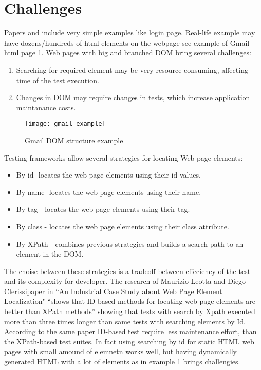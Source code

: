 	\section {Challenges}
	\label {sec:challenges}
		Papers \cite{Xu1} \cite{Zhongen2} and \cite{testGen3} include very simple
		examples like login page. Real-life example may have dozens/hundreds of html
		elements on the webpage see example of Gmail html page \ref{fig:gmailexample}.
		Web pages with big and branched DOM bring several challenges:
		\begin{enumerate}
		  \item Searching for required element may be very resource-consuming,
		  affecting time of the test execution. 
		  \item Changes in DOM may require changes in tests, which increase
		  application maintanance costs.
		\end{enumerate}
		
		\begin{figure}
		\label{fig:gmailexample}
		\texttt{[image: gmail\_example]}
		\caption{Gmail DOM structure example}
		\end{figure}
		
		Testing frameworks allow several strategies for locating Web page elements:
		\begin{itemize}
		  \item By id -locates the web page elements using their id values.
		  \item By name -locates the web page elements using their name.
		  \item By tag - locates the web page elements using their tag.
		  \item By class - locates the web page elements using their class attribute.
		  \item By XPath - combines previous strategies and builds a search
		  path to an element in the DOM.
		\end{itemize}
		
		The choise between these strategies is a tradeoff between effeciency of the
		test and its complexity for developer. The research of Maurizio Leotta
		and Diego Clerissipaper in ``An Industrial Case Study about Web Page Element
		Localization" ``shows that ID-based methods for locating web page elements are
		better than XPath methods''\cite{selenium4} showing that tests with search by
		Xpath executed more than three times longer than same tests with searching
		elements by Id. According to the same paper ID-based test require less
		maintenance effort, than the XPath-based test suites. In fact using searching by id for static HTML web pages with small
		amound of elemnetn works well, but having dynamically generated HTML with 
		a lot of elements as in example \ref{fig:gmailexample} brings challengies.
		
